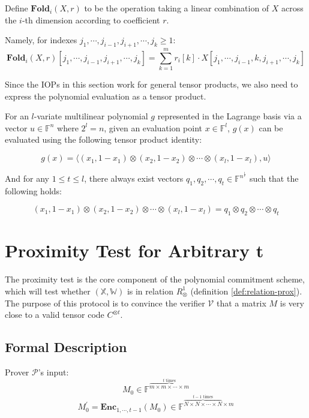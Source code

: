 Define $\textbf{Fold}_i(X, r)$ to be the operation taking a linear combination of $X$ across the $i$-th dimension according to coefficient $r$. 

Namely, for indexes $j_1, \cdots, j_{i-1}, j_{i+1}, \cdots , j_{k} \ge 1$:
$$
\textbf{Fold}_i(X, r)[j_1, \cdots, j_{i-1}, j_{i+1}, \cdots , j_{k}] = \sum_{k=1}^{m} r_{i}[k] \cdot X[j_1, \cdots, j_{i-1}, k, j_{i+1}, \cdots , j_{k}]
$$



Since the IOPs in this section work for general tensor products, we also need to express the polynomial evaluation as a tensor product.

\begin{lemma}
\label{lemma:petq}

For an $l$-variate multilinear polynomial $g$ represented in the Lagrange basis via a vector $u \in \mathbb{F}^{n}$ where $2^l = n$, given an evaluation point $x \in \mathbb{F}^l$, $g(x)$ can be evaluated using the following tensor product identity: 

\[
    g(x) = \langle (x_1, 1-x_1) \otimes (x_2, 1-x_2) \otimes \cdots \otimes (x_l, 1-x_l) , u \rangle
\]

And for any $ 1 \le t  \le l$, there always exist vectors $q_1, q_2, \cdots , q_t \in \mathbb{F}^{n^{\frac{1}{t}}}$ such that the following holds:

\[
    (x_1, 1-x_1) \otimes (x_2, 1-x_2) \otimes \cdots \otimes (x_l, 1-x_l) = q_1 \otimes q_2 \otimes \cdots \otimes q_t
\]

\end{lemma}


\section{Proximity Test for Arbitrary t}

The proximity test is the core component of the polynomial commitment scheme, which will test whether $(\mathbb{X}, \mathbb{W})$ is in relation $R_\otimes^1$ (definition \ref{def:relation-prox}). The purpose of this protocol is to convince the verifier $\mathcal{V}$ that a matrix $M$ is very close to a valid tensor code $C^{\otimes t}$.

\subsection{Formal Description}

Prover $\mathcal{P}$'s input: 
$$
    M_0 \in \mathbb{F}^{\overbrace{m \times m \times \cdots \times m}^{t \text{ times}}}
$$
$$
    M_0^{\prime} = \textbf{Enc}_{1,\cdots,t-1}(M_0) \in \mathbb{F}^{\overbrace{N \times N \times \cdots \times N}^{t-1 \text{ times}} \times m}
$$

